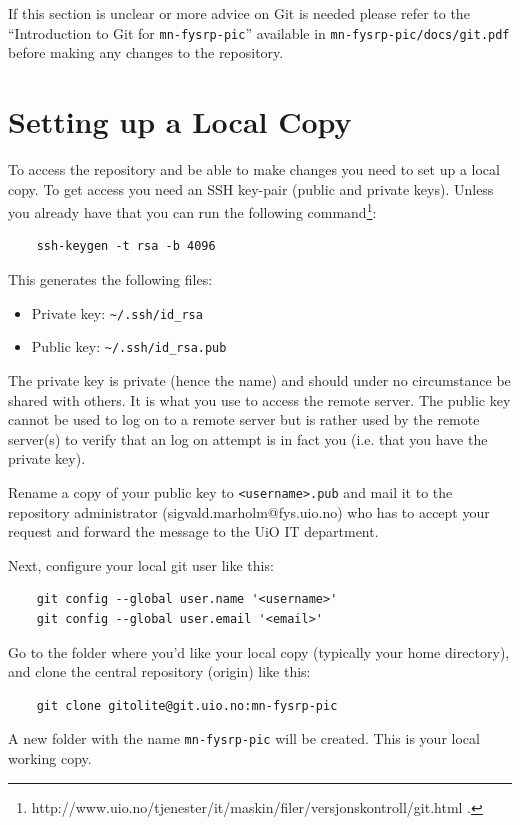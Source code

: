 \documentclass[10pt,a4paper]{article}
\newcommand{\mnfysrppic}{\texttt{mn-fysrp-pic}}
\begin{document}
If this section is unclear or more advice on Git is needed please refer to the ``Introduction to Git for \mnfysrppic{}'' available in \texttt{mn-fysrp-pic/docs/git.pdf} before making any changes to the repository.

\section{Setting up a Local Copy}
To access the repository and be able to make changes you need to set up a local copy. To get access you need an SSH key-pair (public and private keys). Unless you already have that you can run the following command\footnote{http://www.uio.no/tjenester/it/maskin/filer/versjonskontroll/git.html .}:

\begin{lstlisting}
	ssh-keygen -t rsa -b 4096
\end{lstlisting}

This generates the following files:
\begin{itemize}
	\item Private key: \lstinline$~/.ssh/id_rsa$
	\item Public key: \lstinline$~/.ssh/id_rsa.pub$
\end{itemize}
The private key is private (hence the name) and should under no circumstance be shared with others. It is what you use to access the remote server. The public key cannot be used to log on to a remote server but is rather used by the remote server(s) to verify that an log on attempt is in fact you (i.e. that you have the private key).

Rename a copy of your public key to \lstinline$<username>.pub$ and mail it to the repository administrator (sigvald.marholm@fys.uio.no) who has to accept your request and forward the message to the UiO IT department.

Next, configure your local git user like this:

\begin{lstlisting}
	git config --global user.name '<username>'
	git config --global user.email '<email>'
\end{lstlisting}
Go to the folder where you'd like your local copy (typically your home directory), and clone the central repository (origin) like this:

\begin{lstlisting}
	git clone gitolite@git.uio.no:mn-fysrp-pic
\end{lstlisting}
A new folder with the name \lstinline$mn-fysrp-pic$ will be created. This is your local working copy.
\end{document}
